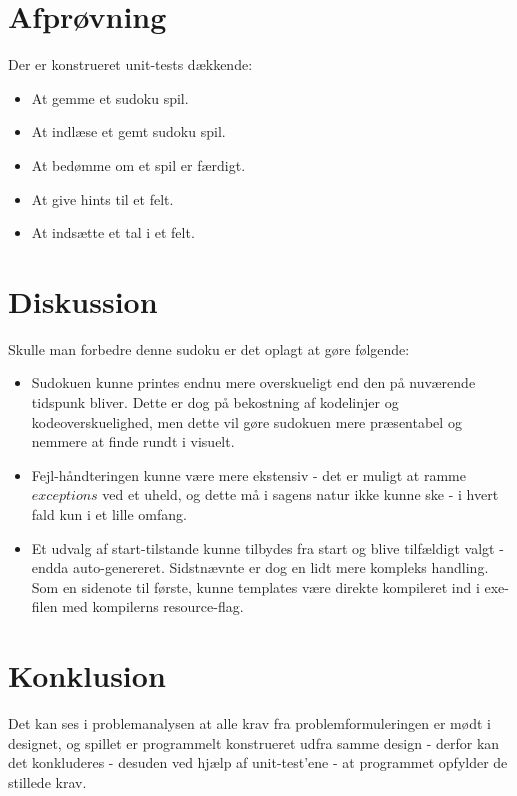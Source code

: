 \documentclass[a4paper]{article}
\begin{document}
	\section{Afprøvning}
	Der er konstrueret unit-tests dækkende:
	\begin{itemize}
	    \item At gemme et sudoku spil.
	    \item At indlæse et gemt sudoku spil.
	    \item At bedømme om et spil er færdigt.
	    \item At give hints til et felt.
	    \item At indsætte et tal i et felt.
    \end{itemize}
	
	\section{Diskussion}
	Skulle man forbedre denne sudoku er det oplagt at gøre følgende:
	\begin{itemize}
	    \item Sudokuen kunne printes endnu mere overskueligt end den på nuværende tidspunk bliver. Dette er dog på bekostning af kodelinjer og kodeoverskuelighed, men dette vil gøre sudokuen mere præsentabel og nemmere at finde rundt i visuelt.
	    \item Fejl-håndteringen kunne være mere ekstensiv - det er muligt at ramme $exceptions$ ved et uheld, og dette må i sagens natur ikke kunne ske - i hvert fald kun i et lille omfang.
	    \item Et udvalg af start-tilstande kunne tilbydes fra start og blive tilfældigt valgt - endda auto-genereret. Sidstnævnte er dog en lidt mere kompleks handling. Som en sidenote til første, kunne templates være direkte kompileret ind i exe-filen med kompilerns resource-flag.
    \end{itemize}
	
	
	\section{Konklusion}
	Det kan ses i problemanalysen at alle krav fra problemformuleringen er mødt i designet, og spillet er programmelt konstrueret udfra samme design - derfor kan det konkluderes - desuden ved hjælp af unit-test'ene - at programmet opfylder de stillede krav.
	
\end{document}
